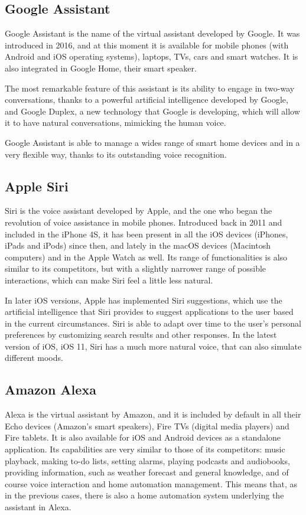 \subsection{Google Assistant}
Google Assistant is the name of the virtual assistant developed by Google. It was introduced in 2016, and at this moment it is
available for mobile phones (with Android and iOS operating systems), laptops, TVs, cars and smart watches. It is also integrated in
Google Home, their smart speaker.\cite{googleAssistant}

The most remarkable feature of this assistant is its ability to engage in two-way conversations, thanks to a powerful artificial intelligence
developed by Google, and Google Duplex, a new technology that Google is developing, which will allow it to have natural conversations,
mimicking the human voice.

Google Assistant is able to manage a wides range of smart home devices and in a very flexible way, thanks to its outstanding voice
recognition.

\subsection{Apple Siri}
Siri is the voice assistant developed by Apple, and the one who began the revolution of voice assistance in mobile phones. Introduced
back in 2011 and included in the iPhone 4S, it has been present in all the iOS devices (iPhones, iPads and iPods) since then, and lately
in the macOS devices (Macintosh computers) and in the Apple Watch as well.\cite{appleIOSSiri} Its range of functionalities is also
similar to its competitors, but with a slightly narrower range of possible interactions, which can make Siri feel a little less natural.

In later iOS versions, Apple has implemented Siri suggestions, which use the artificial intelligence that Siri provides to suggest
applications to the user based in the current circumstances. Siri is able to adapt over time to the user's personal preferences by
customizing search results and other responses. In the latest version of iOS, iOS 11, Siri has a much more natural voice, that can
also simulate different moods.

\subsection{Amazon Alexa}
Alexa is the virtual assistant by Amazon, and it is included by default in all their Echo devices (Amazon's smart speakers), Fire TVs
(digital media players) and Fire tablets. It is also available for iOS and Android devices as a standalone application. Its capabilities are
very similar to those of its competitors: music playback, making to-do lists, setting alarms, playing podcasts and audiobooks, providing
information, such as weather forecast and general knowledge, and of course voice interaction and home automation management.
This means that, as in the previous cases, there is also a home automation system underlying the assistant in Alexa.

